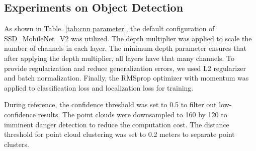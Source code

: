 \documentclass{ieeeaccess}
\begin{document}
\subsection{Experiments on Object Detection}


 As shown in Table. \ref{tab:cnn parameter}, the default configuration of SSD\_MobileNet\_V2 was utilized. The depth multiplier was applied to scale the number of channels in each layer. The minimum depth parameter ensures that after applying the depth multiplier, all layers have that many channels. To provide regularization and reduce generalization errors, we used L2 regularizer and batch normalization. Finally, the RMSprop optimizer with momentum was applied to classification loss and localization loss for training.
 

During reference, the confidence threshold was set to 0.5 to filter out low-confidence results. The point clouds were downsampled to 160 by 120 to imminent danger detection to reduce the computation cost. The distance threshold for point cloud clustering was set to 0.2 meters to separate point clusters. 
\end{document}
